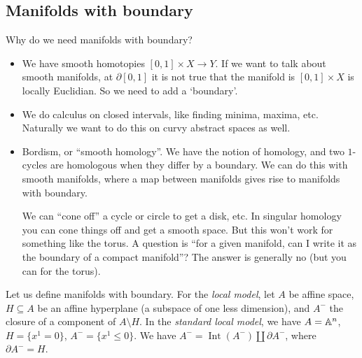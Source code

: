 \subsection{Manifolds with boundary}
Why do we need manifolds with boundary?
\begin{itemize}
    \item We have smooth homotopies $[0,1] \times X \to Y$. If we want to talk about smooth manifolds, at $\partial [0,1]$ it is not true that the manifold is $[0,1]\times X$ is locally Euclidian. So we need to add a `boundary'.
    \item We do calculus on closed intervals, like finding minima, maxima, etc. Naturally we want to do this on curvy abstract spaces as well.
    \item Bordism, or ``smooth homology''. We have the notion of homology, and two $1$-cycles are homologous when they differ by a boundary. We can do this with smooth manifolds, where a map between manifolds gives rise to manifolds with boundary. 

        We can ``cone off'' a cycle or circle to get a disk, etc. In singular homology you can cone things off and get a smooth space. But this won't work for something like the torus. A question is ``for a given manifold, can I write it as the boundary of a compact manifold''? The answer is generally no (but you can for the torus).
\end{itemize}
Let us define manifolds with boundary. For the \emph{local model}, let $A$ be affine space, $H \subseteq A$ be an affine hyperplane (a subspace of one less dimension), and $A^-$ the closure of a component of $A \setminus H$. In the \emph{standard local model}, we have $A=\mathbb{A}^n $, $H=\{x^1=0\} $, $A^-=\{x^1\leq 0\} $. We have $A^-=\operatorname{Int}(A^-) \amalg \partial A^-$, where $\partial A^-=H$.

